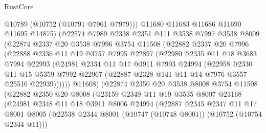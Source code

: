 \begin{lexlean}{RustCore}
\begin{coremodule}
                  @10789
                  (@10752 (@10791 @7961 @7979)))
                @11680
                @11683
                @11686
                @11690
                @11695
                @14875)
              (@22574
                @7989
                @2338
                @2351
                @111
                @3538
                @7997
                @3538
                @8009
                (@22874
                  @2337
                  @20
                  @3538
                  @7996
                  @3754
                  @11508
                  (@22882
                    @2337
                    @20
                    @7996
                    (@22888
                      @2336
                      @11
                      @19
                      @3757
                      @7995
                      @22897
                      (@22980
                        @2335
                        @11
                        @18
                        @3683
                        @7994
                        @22993
                        (@24981
                          @2334
                          @11
                          @17
                          @3911
                          @7993
                          @24994
                          (@22958
                            @2330
                            @11
                            @15
                            @5359
                            @7992
                            @22967
                            (@22887 @2328 @141 @11 @14 @7976 @3557 @25516 @22939))))))
                  @11608)
                (@22874
                  @2350
                  @20
                  @3538
                  @8008
                  @3754
                  @11508
                  (@22882
                    @2350
                    @20
                    @8008
                    (@23159
                      @2349
                      @11
                      @19
                      @3535
                      @8007
                      @23168
                      (@24981
                        @2348
                        @11
                        @18
                        @3911
                        @8006
                        @24994
                        (@22887
                          @2345
                          @2347
                          @11
                          @17
                          @8001
                          @8005
                          (@22538 @2344 @8001 (@10747 (@10748 @8001)) (@10752 (@10754 @2344 @11)))

\end{coremodule}
\end{lexlean}
